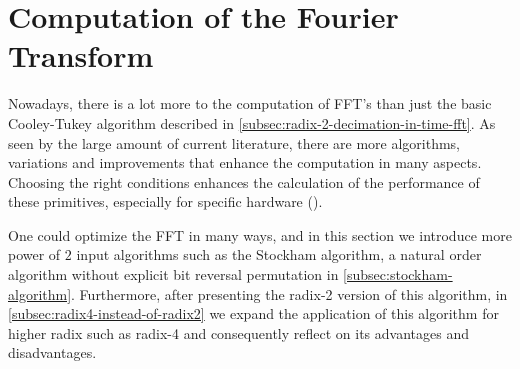 \documentclass[
  oneside,
  11pt, a4paper,
  footinclude=true,
  headinclude=true,
  cleardoublepage=empty
]{scrbook}
\begin{document}





\chapter{Computation of the Fourier Transform}


Nowadays, there is a lot more to the computation of FFT's than just the basic Cooley-Tukey algorithm described in \autoref{subsec:radix-2-decimation-in-time-fft}. As seen by the large amount of current literature, there are more algorithms, variations and improvements that enhance the computation in many aspects. Choosing the right conditions enhances the calculation of the performance of these primitives, especially for specific hardware (\cite{mermer2003efficient}). 

One could optimize the FFT in many ways, and in this section we introduce more power of $2$ input algorithms such as the Stockham algorithm, a natural order algorithm without explicit bit reversal permutation in \autoref{subsec:stockham-algorithm}. Furthermore, after presenting the radix-2 version of this algorithm, in \autoref{subsec:radix4-instead-of-radix2} we expand the application of this algorithm for higher radix such as radix-4 and consequently reflect on its advantages and disadvantages.

\end{document}
